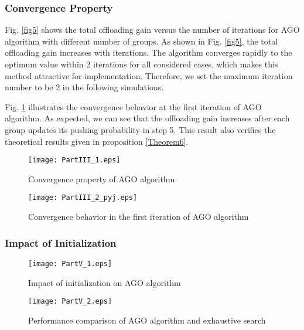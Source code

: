 \documentclass[12pt, draftclsnofoot, onecolumn]{IEEEtran}
\begin{document}
\subsubsection{Convergence Property}

Fig. \ref{fig5} shows the total offloading gain versus the number of iterations for AGO algorithm with different number of groups. As shown in Fig. \ref{fig5}, the total offloading gain increases with iterations. The algorithm converges rapidly to the optimum value within 2 iterations for all considered cases, which makes this method attractive for implementation. Therefore, we set the maximum iteration number to be 2 in the following simulations.

Fig. \ref{fig6} illustrates the convergence behavior at the first iteration of  AGO algorithm.
As expected, we can see that the offloading gain increases after each group updates its pushing probability in step 5.
This result also verifies the theoretical results given in proposition \ref{Theorem6}.

\begin{figure}
\begin{minipage}[t]{0.5\textwidth}
\centering
\texttt{[image: PartIII\_1.eps]}
\caption{Convergence property of AGO algorithm}
\label{fig5}
\end{minipage}
\begin{minipage}[t]{0.5\textwidth}
\centering
\texttt{[image: PartIII\_2\_pyj.eps]}
\caption{Convergence behavior in the first iteration of AGO algorithm}
\label{fig6}
\end{minipage}
\end{figure}

\subsubsection{Impact of Initialization}

\begin{figure}
\begin{minipage}[t]{0.5\textwidth}
\centering
\texttt{[image: PartV\_1.eps]}
\caption{Impact of initialization on AGO algorithm}
\label{fig7}
\end{minipage}
\begin{minipage}[t]{0.5\textwidth}
\centering
\texttt{[image: PartV\_2.eps]}
\caption{Performance comparison of AGO algorithm and exhaustive search}
\label{fig8}
\end{minipage}
\end{figure}
\end{document}
